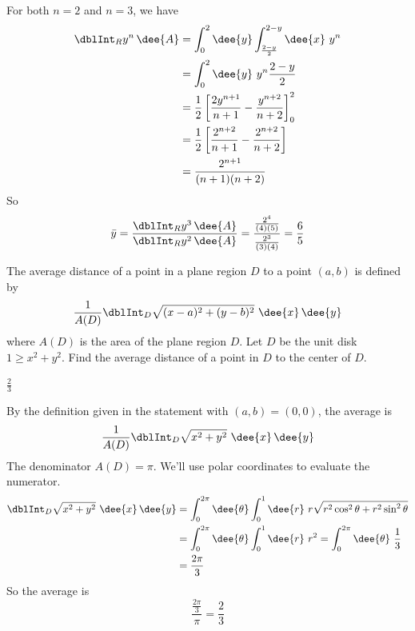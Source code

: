 \begin{solution}
For both $n=2$ and $n=3$, we have
\begin{align*}
\dblInt_R y^n\,\dee{A}
&=\int_0^2\dee{y} \int_{\frac{2-y}{2}}^{2-y}\dee{x}\ y^n \\
&=\int_0^2\dee{y} \ y^n\frac{2-y}{2} \\
&=\frac{1}{2}\left[\frac{2y^{n+1}}{n+1}-\frac{y^{n+2}}{n+2}\right]_0^2 \\
&=\frac{1}{2}\left[\frac{2^{n+2}}{n+1}-\frac{2^{n+2}}{n+2}\right] \\
&=\frac{2^{n+1}}{(n+1)(n+2)}
\end{align*}
So 
\begin{align*}
\bar y =\frac{\dblInt_R y^3\,\dee{A}}{\dblInt_R y^2\,\dee{A}}
       =\frac{ \frac{2^4}{(4)(5)} }{ \frac{2^{3}}{(3)(4)} }
       =\frac{6}{5}
\end{align*}
\end{solution}

\begin{question}[M200 2012A] %
The average distance of a point in a plane region $D$ to a point $(a, b)$ is defined by
\begin{equation*}
\frac{1}{A(D)}\dblInt_D \sqrt{(x-a)^2+(y-b)^2}\ \dee{x}\,\dee{y}
\end{equation*}
where $A(D)$ is the area of the plane region $D$. Let $D$ be the unit disk 
$1 \ge x^2 + y^2$.
Find the average distance of a point in $D$ to the center of $D$.
\end{question}

%

\begin{answer}
$\frac{2}{3}$
\end{answer}

\begin{solution}
By the definition given in the statement with $(a,b)=(0,0)$,
the average is
\begin{align*}
\frac{1}{A(D)}\dblInt_D \sqrt{x^2+y^2}\ \dee{x}\,\dee{y}
\end{align*}
The denominator $A(D) = \pi$. We'll use polar coordinates to evaluate the
numerator.
\begin{align*}
\dblInt_D \sqrt{x^2+y^2}\ \dee{x}\,\dee{y}
&=\int_0^{2\pi}\dee{\theta}\int_0^1\dee{r}
     \ r\sqrt{r^2\cos^2\theta+r^2\sin^2\theta} \\
&=\int_0^{2\pi}\dee{\theta}\int_0^1\dee{r}\ r^2 
=\int_0^{2\pi}\dee{\theta}\ \frac{1}{3} \\
&=\frac{2\pi}{3}
\end{align*}
So the average is
\begin{equation*}
\frac{\frac{2\pi}{3}}{\pi}=\frac{2}{3}
\end{equation*}
\end{solution}

